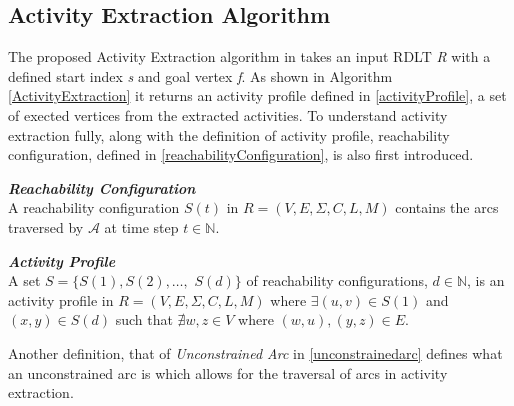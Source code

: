 \subsection*{Activity Extraction Algorithm}
The proposed Activity Extraction algorithm in \cite{Malinao2017} takes an input RDLT \emph{R} with a defined start index \emph{s} and goal vertex \emph{f}. As shown in Algorithm \ref{ActivityExtraction} it returns an activity profile defined in \ref{activityProfile}, a set of exected vertices from the extracted activities.
To understand activity extraction fully, along with the definition of activity profile, reachability configuration, defined in \ref{reachabilityConfiguration}, is also first introduced.
\begin{defn}\label{reachabilityConfiguration}
    \textit{\textbf{Reachability Configuration}}\\
    A reachability configuration $S(t)$ in $R = (V, E, \Sigma, C, L, M)$ contains the arcs traversed by ${\mathcal A}$ at time step $t \in {\mathbb{N}}$.
\end{defn}
\begin{defn}\label{activityProfile}
    \textit{\textbf{Activity Profile}}\\
    A set $S = \{S(1), S(2), \ldots,$ $S(d)\}$ of reachability configurations, $d \in {\mathbb{N}}$, is an activity profile in $R = (V, E, \Sigma, C, L, M)$ where $\exists(u,v) \in S(1)$ and $(x,y) \in S(d)$ such that $\nexists w, z \in V$ where $(w,u), (y, z) \in E$. 
\end{defn}
Another definition, that of \emph{Unconstrained Arc} in \ref{unconstrainedarc} defines what an unconstrained arc is which allows for the traversal of arcs in activity extraction.

